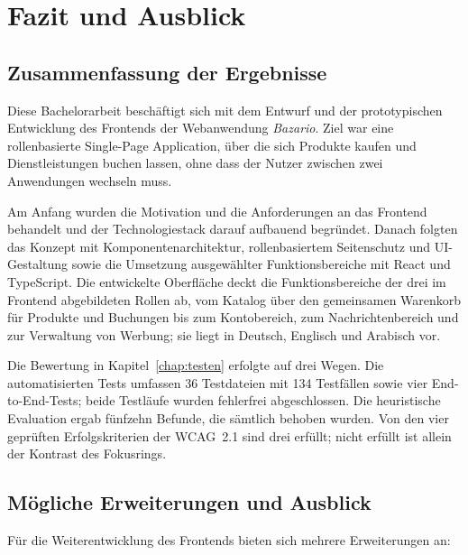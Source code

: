 \chapter{Fazit und Ausblick}
\label{chap:fazit}

\section{Zusammenfassung der Ergebnisse}
\label{sec:zusammenfassung}

Diese Bachelorarbeit beschäftigt sich mit dem Entwurf und der
prototypischen Entwicklung des Frontends der Webanwendung
\textit{Bazario}. Ziel war eine rollenbasierte Single-Page
Application, über die sich Produkte kaufen und Dienstleistungen buchen
lassen, ohne dass der Nutzer zwischen zwei Anwendungen wechseln muss.

Am Anfang wurden die Motivation und die Anforderungen an das Frontend
behandelt und der Technologiestack darauf aufbauend begründet. Danach
folgten das Konzept mit Komponentenarchitektur, rollenbasiertem
Seitenschutz und \acs{UI}-Gestaltung sowie die Umsetzung ausgewählter
Funktionsbereiche mit React und TypeScript. Die entwickelte Oberfläche
deckt die Funktionsbereiche der drei im Frontend abgebildeten Rollen
ab, vom Katalog über den gemeinsamen Warenkorb für Produkte und
Buchungen bis zum Kontobereich, zum Nachrichtenbereich und zur
Verwaltung von Werbung; sie liegt in Deutsch, Englisch und Arabisch
vor.

Die Bewertung in Kapitel~\ref{chap:testen} erfolgte auf drei Wegen.
Die automatisierten Tests umfassen 36 Testdateien mit 134 Testfällen sowie vier End-to-End-Tests; beide Testläufe wurden fehlerfrei abgeschlossen. Die
heuristische Evaluation ergab fünfzehn Befunde, die sämtlich behoben
wurden. Von den vier geprüften Erfolgskriterien der
\acs{WCAG}~2.1 sind drei erfüllt; nicht erfüllt ist allein der
Kontrast des Fokusrings.

\section{Mögliche Erweiterungen und Ausblick}
\label{sec:ausblick}

Für die Weiterentwicklung des Frontends bieten sich mehrere
Erweiterungen an:

